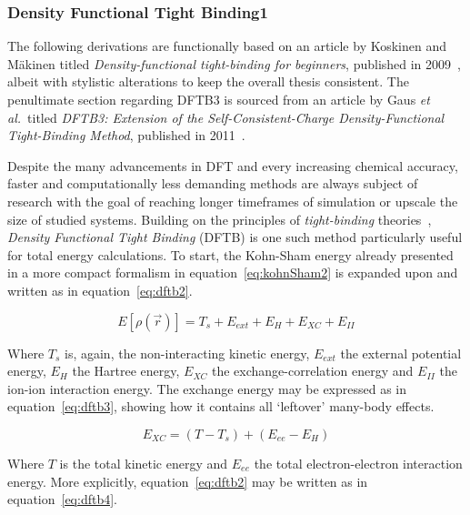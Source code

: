 \documentclass[12pt]{article}
\begin{document}
\subsubsection{Density Functional Tight Binding1}
The following derivations are functionally based on an article by Koskinen and Mäkinen titled \textit{Density-functional tight-binding for beginners}, published in 2009~\cite{Koskinen2009}, albeit with stylistic alterations to keep the overall thesis consistent.
The penultimate section regarding DFTB3 is sourced from an article by Gaus \textit{et al.}~titled \textit{DFTB3: Extension of the Self-Consistent-Charge Density-Functional Tight-Binding Method}, published in 2011~\cite{Gaus2011}.
\\ \par \noindent Despite the many advancements in DFT and every increasing chemical accuracy, faster and computationally less demanding methods are always subject of research with the goal of reaching longer timeframes of simulation or upscale the size of studied systems.
Building on the principles of \textit{tight-binding} theories~\cite{Goringe1997},  \textit{Density Functional Tight Binding} (DFTB) is one such method particularly useful for total energy calculations.
To start, the Kohn-Sham energy already presented in a more compact formalism in equation~\ref{eq:kohnSham2} is expanded upon and written as in equation~\ref{eq:dftb2}.

\begin{equation}
  E[\rho(\vec{r})] = T_s + E_{ext} + E_{H} + E_{XC} + E_{II}
  \label{eq:dftb2}
\end{equation}

\bigskip

\noindent Where $T_s$ is, again, the non-interacting kinetic energy, $E_{ext}$ the external potential energy, $E_{H}$ the Hartree energy, $E_{XC}$ the exchange-correlation energy and $E_{II}$ the ion-ion interaction energy.
The exchange energy may be expressed as in equation~\ref{eq:dftb3}, showing how it contains all `leftover' many-body effects.

\begin{equation}
  E_{XC} = (T-T_s) + (E_{ee} - E_{H})
  \label{eq:dftb3}
\end{equation}

\bigskip

\noindent Where $T$ is the total kinetic energy and $E_{ee}$ the total electron-electron interaction energy.
More explicitly, equation~\ref{eq:dftb2} may be written as in equation~\ref{eq:dftb4}.
\end{document}
